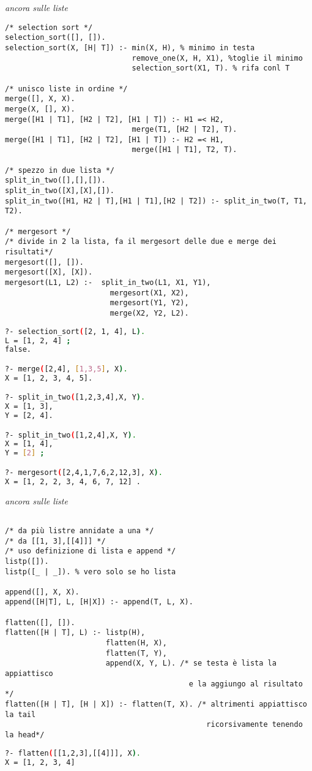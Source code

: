 \documentclass[a4paper,12pt, oneside]{book}
\begin{document}
\begin{esercizio}
\textit{ancora sulle liste}
\begin{verbatim}
/* selection sort */
selection_sort([], []).
selection_sort(X, [H| T]) :- min(X, H), % minimo in testa
                             remove_one(X, H, X1), %toglie il minimo
                             selection_sort(X1, T). % rifa conl T

/* unisco liste in ordine */
merge([], X, X).
merge(X, [], X).
merge([H1 | T1], [H2 | T2], [H1 | T]) :- H1 =< H2,
                             merge(T1, [H2 | T2], T).
merge([H1 | T1], [H2 | T2], [H1 | T]) :- H2 =< H1,
                             merge([H1 | T1], T2, T).

/* spezzo in due lista */
split_in_two([],[],[]).
split_in_two([X],[X],[]).
split_in_two([H1, H2 | T],[H1 | T1],[H2 | T2]) :- split_in_two(T, T1, T2).

/* mergesort */
/* divide in 2 la lista, fa il mergesort delle due e merge dei risultati*/
mergesort([], []).
mergesort([X], [X]).
mergesort(L1, L2) :-  split_in_two(L1, X1, Y1),
                        mergesort(X1, X2),
                        mergesort(Y1, Y2),
                        merge(X2, Y2, L2).
\end{verbatim}
\begin{shaded}
\begin{lstlisting}[language=bash]
?- selection_sort([2, 1, 4], L).
L = [1, 2, 4] ;
false.

?- merge([2,4], [1,3,5], X).
X = [1, 2, 3, 4, 5].

?- split_in_two([1,2,3,4],X, Y).
X = [1, 3],
Y = [2, 4].

?- split_in_two([1,2,4],X, Y).
X = [1, 4],
Y = [2] ;

?- mergesort([2,4,1,7,6,2,12,3], X).
X = [1, 2, 2, 3, 4, 6, 7, 12] .

\end{lstlisting}
\end{shaded}
\end{esercizio}
\begin{esercizio}
\textit{ancora sulle liste}
\begin{verbatim}

/* da più listre annidate a una */
/* da [[1, 3],[[4]]] */
/* uso definizione di lista e append */
listp([]).
listp([_ | _]). % vero solo se ho lista

append([], X, X).
append([H|T], L, [H|X]) :- append(T, L, X).

flatten([], []).
flatten([H | T], L) :- listp(H),
                       flatten(H, X),
                       flatten(T, Y),
                       append(X, Y, L). /* se testa è lista la appiattisco
                                          e la aggiungo al risultato */
flatten([H | T], [H | X]) :- flatten(T, X). /* altrimenti appiattisco la tail
                                              ricorsivamente tenendo la head*/
\end{verbatim}
\begin{shaded}
\begin{lstlisting}[language=bash]
?- flatten([[1,2,3],[[4]]], X).
X = [1, 2, 3, 4] 
\end{lstlisting}
\end{shaded}
\end{esercizio}
\end{document}
